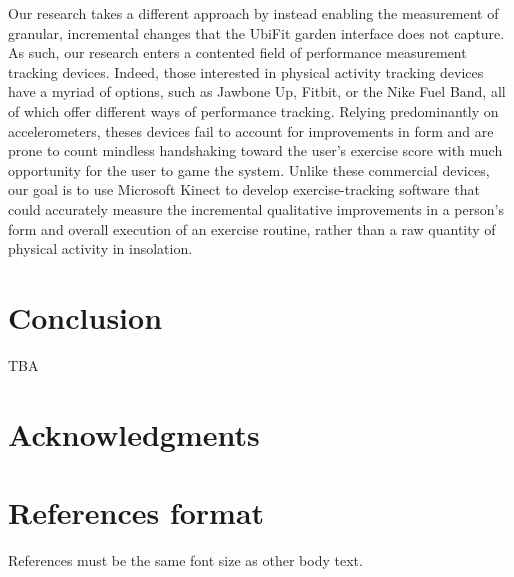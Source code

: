 \documentclass{sigchi}
\begin{document}
Our research takes a different approach by instead enabling the measurement of granular, incremental changes that the UbiFit garden interface does not capture. As such, our research enters a contented field of performance measurement tracking devices. Indeed, those interested in physical activity tracking devices have a myriad of options, such as Jawbone Up, Fitbit, or the Nike Fuel Band, all of which offer different ways of performance tracking. Relying predominantly on accelerometers, theses devices fail to account for improvements in form and are prone to count mindless handshaking toward the user's exercise score with much opportunity for the user to game the system. Unlike these commercial devices, our goal is to use Microsoft Kinect to develop exercise-tracking software that could accurately measure the incremental qualitative improvements in a person's form and overall execution of an exercise routine, rather than a raw quantity of physical activity in insolation.

\section{Conclusion}

TBA

\section{Acknowledgments}
\section{References format}
References must be the same font size as other body text.



\end{document}
